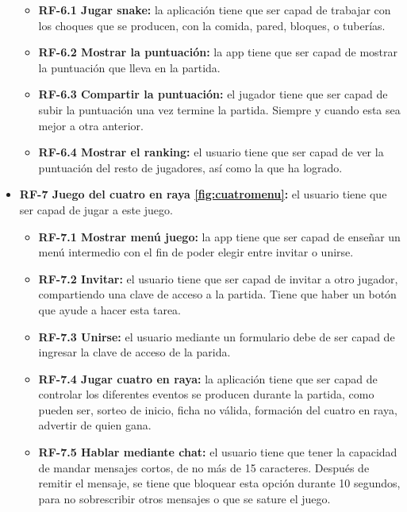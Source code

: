 \begin{itemize}
	\begin{itemize}
		\tightlist
		\item \textbf{RF-6.1 Jugar snake:} la aplicación tiene que ser capad de trabajar con los choques que se producen, con la comida, pared, bloques, o tuberías.
		\item \textbf{RF-6.2 Mostrar la puntuación:} la app tiene que ser capad de mostrar la puntuación que lleva en la partida.
		\item \textbf{RF-6.3 Compartir la puntuación:} el jugador tiene que ser capad de subir la puntuación una vez termine la partida. Siempre y cuando esta sea mejor a otra anterior.
		\item \textbf{RF-6.4 Mostrar el ranking:} el usuario tiene que ser capad de ver la puntuación del resto de jugadores, así como la que ha logrado.
	\end{itemize}

	\item \textbf{RF-7 Juego del cuatro en raya \ref{fig:cuatromenu}:} el usuario tiene que ser capad de jugar a este juego.
	
	\begin{itemize}
		\tightlist
		\item \textbf{RF-7.1 Mostrar menú juego:} la app tiene que ser capad de enseñar un menú intermedio con el fin de poder elegir entre invitar o unirse.
		\item \textbf{RF-7.2 Invitar:} el usuario tiene que ser capad de invitar a otro jugador, compartiendo una clave de acceso a la partida. Tiene que haber un botón que ayude a hacer esta tarea.
		\item \textbf{RF-7.3 Unirse:} el usuario mediante un formulario debe de ser capad de ingresar la clave de acceso de la parida.
		\item \textbf{RF-7.4 Jugar cuatro en raya:} la aplicación tiene que ser capad de controlar los diferentes eventos se producen durante la partida, como pueden ser, sorteo de inicio, ficha no válida, formación del cuatro en raya, advertir de quien gana.
		\item \textbf{RF-7.5 Hablar mediante chat:} el usuario tiene que tener la capacidad de mandar mensajes cortos, de no más de 15 caracteres. Después de remitir el mensaje, se tiene que bloquear esta opción durante 10 segundos, para no sobrescribir otros mensajes o que se sature el juego.
	\end{itemize}

\end{itemize}


